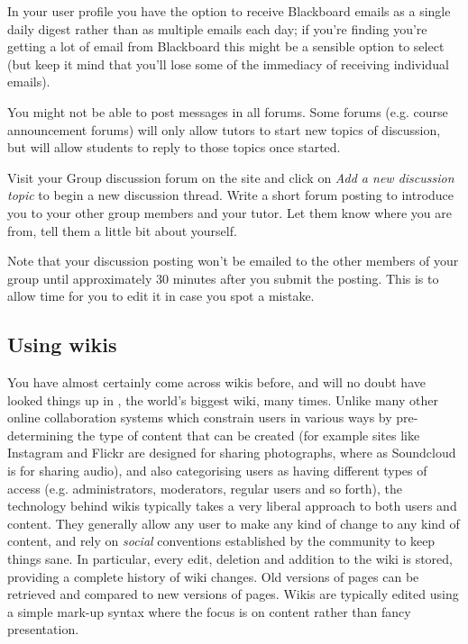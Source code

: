 \begin{firstonly}
In your user profile you have the option to receive Blackboard emails as a single daily digest rather than as multiple emails each day; if you're finding you're getting a lot of email from Blackboard this might be a sensible option to select (but keep it mind that you'll lose some of the immediacy of receiving individual emails).

You might not be able to post messages in all forums. Some forums (e.g. course announcement forums) will only allow tutors to start new topics of discussion, but will allow students to reply to those topics once started.

Visit your Group discussion forum on the  site and click on \emph{Add a new discussion topic}  to begin a new discussion thread. Write a short forum posting to introduce you to your other group members and your tutor. Let them know where you are from, tell them a little bit about yourself.

Note that your discussion posting won't be emailed to the other members of your group until approximately 30 minutes after you submit the posting. This is to allow time for you to edit it in case you spot a mistake.


\subsection{Using wikis}
\label{sec:using-wikis}


You have almost certainly come across wikis before, and will no doubt have looked things up in , the world's biggest wiki, many times. Unlike many other online collaboration systems which constrain users in various ways by pre-determining the type of content that can be created (for example sites like Instagram and Flickr are designed for sharing photographs, where as Soundcloud is for sharing audio), and also categorising users as having different types of access (e.g. administrators, moderators, regular users and so forth), the technology behind wikis typically takes a very liberal approach to both users and content. They generally allow any user to make any kind of change to any kind of content, and rely on \textit{social} conventions established by the community to keep things sane. In particular, every edit, deletion and addition to the wiki is stored, providing a complete history of wiki changes. Old versions of pages can be retrieved and compared to new versions of pages. Wikis are typically edited using a simple mark-up syntax where the focus is on content rather than fancy presentation.



\end{firstonly}
